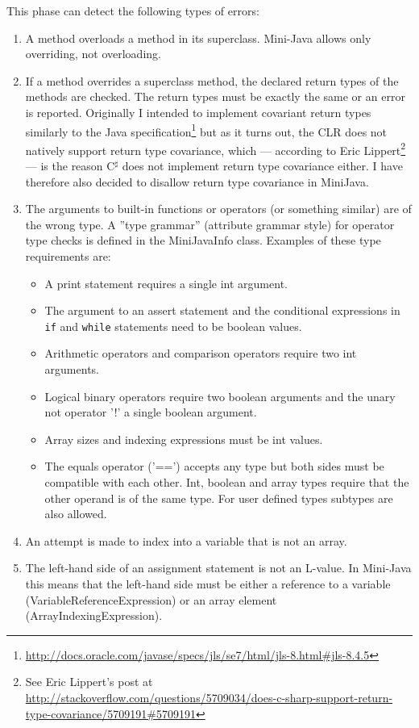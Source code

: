 \documentclass[a4paper,11pt]{article}
\begin{document}
This phase can detect the following types of errors:
\begin{enumerate}
\item A method overloads a method in its superclass. Mini-Java allows only overriding, not overloading.
\item If a method overrides a superclass method, the declared return types of the methods are checked. The return types must be exactly the same or an error is reported. Originally I intended to implement covariant return types similarly to the Java specification\footnote{\url{http://docs.oracle.com/javase/specs/jls/se7/html/jls-8.html\#jls-8.4.5}} but as it turns out, the CLR does not natively support return type covariance, which --- according to Eric Lippert\footnote{See Eric Lippert's post at \\ \url{http://stackoverflow.com/questions/5709034/does-c-sharp-support-return-type-covariance/5709191\#5709191}} --- is the reason C$^\sharp$ does not implement return type covariance either. I have therefore also decided to disallow return type covariance in MiniJava.
\item The arguments to built-in functions or operators (or something similar) are of the wrong type. A ''type grammar'' (attribute grammar style) for operator type checks is defined in the MiniJavaInfo class. Examples of these type requirements are:
\begin{itemize}
\item A print statement requires a single int argument.
\item The argument to an assert statement and the conditional expressions in \verb,if, and \verb,while, statements need to be boolean values.
\item Arithmetic operators and comparison operators require two int arguments.
\item Logical binary operators require two boolean arguments and the unary not operator '!' a single boolean argument.
\item Array sizes and indexing expressions must be int values.
\item The equals operator ('==') accepts any type but both sides must be compatible with each other. Int, boolean and array types require that the other operand is of the same type. For user defined types subtypes are also allowed.
\end{itemize}
\item An attempt is made to index into a variable that is not an array.
\item The left-hand side of an assignment statement is not an L-value. In Mini-Java this means that the left-hand side must be either a reference to a variable (VariableReferenceExpression) or an array element (ArrayIndexingExpression).

\end{enumerate}
\end{document}
